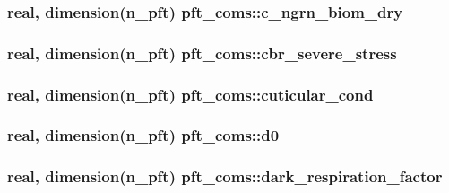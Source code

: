 \subsubsection[{c\+\_\+ngrn\+\_\+biom\+\_\+dry}]{\setlength{\rightskip}{0pt plus 5cm}real, dimension(n\+\_\+pft) pft\+\_\+coms\+::c\+\_\+ngrn\+\_\+biom\+\_\+dry}\label{namespacepft__coms_a59778cca6e42ffcda34a2b44b31c0d80}
\hypertarget{namespacepft__coms_aefc2c80125aa55f81fae3724cb4d5339}{}
\subsubsection[{cbr\+\_\+severe\+\_\+stress}]{\setlength{\rightskip}{0pt plus 5cm}real, dimension(n\+\_\+pft) pft\+\_\+coms\+::cbr\+\_\+severe\+\_\+stress}\label{namespacepft__coms_aefc2c80125aa55f81fae3724cb4d5339}
\hypertarget{namespacepft__coms_a123da989ae706b508ed48db4a138ff8e}{}
\subsubsection[{cuticular\+\_\+cond}]{\setlength{\rightskip}{0pt plus 5cm}real, dimension(n\+\_\+pft) pft\+\_\+coms\+::cuticular\+\_\+cond}\label{namespacepft__coms_a123da989ae706b508ed48db4a138ff8e}
\hypertarget{namespacepft__coms_aafd962aec98e7e8c1cfefd6543409bd5}{}
\subsubsection[{d0}]{\setlength{\rightskip}{0pt plus 5cm}real, dimension(n\+\_\+pft) pft\+\_\+coms\+::d0}\label{namespacepft__coms_aafd962aec98e7e8c1cfefd6543409bd5}
\hypertarget{namespacepft__coms_acd493e3e4371571956c651698a6462b9}{}
\subsubsection[{dark\+\_\+respiration\+\_\+factor}]{\setlength{\rightskip}{0pt plus 5cm}real, dimension(n\+\_\+pft) pft\+\_\+coms\+::dark\+\_\+respiration\+\_\+factor}\label{namespacepft__coms_acd493e3e4371571956c651698a6462b9}
\hypertarget{namespacepft__coms_a5dbaccf1767dc343b4dca7f5e25f358b}{}

